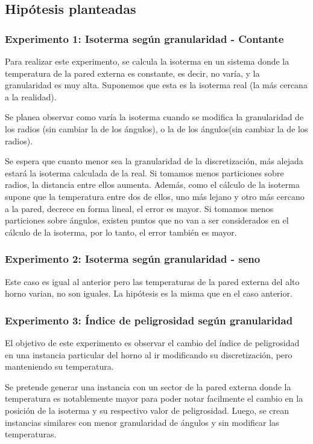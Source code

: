   \subsection{Hipótesis planteadas}

    \subsubsection*{Experimento 1: Isoterma según granularidad - Contante}
    Para realizar este experimento, se calcula la isoterma en un sistema donde la temperatura de la pared externa es constante, es decir, no varía, y la granularidad es muy alta. Suponemos que esta es la isoterma real (la más cercana a la realidad). 

    Se planea observar como varía la isoterma cuando se modifica la granularidad de los radios (sin cambiar la de los ángulos), o la de los ángulos(sin cambiar la de los radios).

    Se espera que cuanto menor sea la granularidad de la discretización, más alejada estará la isoterma calculada de la real. Si tomamos menos particiones sobre radios, la distancia entre ellos aumenta. Además, como el cálculo de la isoterma supone que la temperatura entre dos de ellos, uno más lejano y otro más cercano a la pared, decrece en forma lineal, el error es mayor. Si tomamos menos particiones sobre ángulos, existen puntos que no van a ser considerados en el cálculo de la isoterma, por lo tanto, el error también es mayor.

    \subsubsection*{Experimento 2: Isoterma según granularidad - seno}
    Este caso es igual al anterior pero las temperaturas de la pared externa del alto horno varian, no son iguales. La hipótesis es la misma que en el caso anterior.


  	\subsubsection*{Experimento 3: Índice de peligrosidad según granularidad}
  	El objetivo de este experimento es observar el cambio del índice de peligrosidad en una instancia particular del horno al ir modificando su discretización, pero manteniendo su temperatura. 

  	Se pretende generar una instancia con un sector de la pared externa donde la temperatura es notablemente mayor para poder notar facilmente el cambio en la posición de la isoterma y su respectivo valor de peligrosidad. Luego, se crean instancias similares con menor granularidad de ángulos y sin modificar las temperaturas. 


